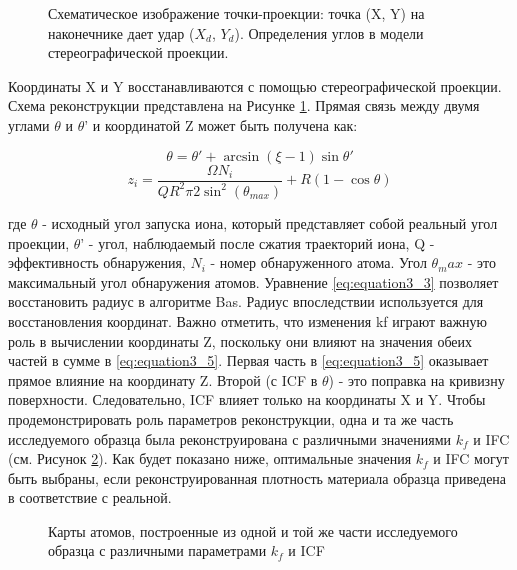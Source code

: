 \begin{figure}[htb]
	\caption{Схематическое изображение точки-проекции: точка (X, Y) на наконечнике дает удар ($X_d$, $Y_d$). Определения углов в модели стереографической проекции.}
	\label{fig:p3_projection}
\end{figure} 
Координаты X и Y восстанавливаются с помощью стереографической проекции. Схема реконструкции представлена на Рисунке \cref{fig:p3_projection}. Прямая связь между двумя углами $\theta$ и $\theta$' и координатой Z может быть получена как:

\begin{equation}
	\label{eq:equation3_4}
	\theta = \theta' + \arcsin(\xi - 1)\sin{\theta'}
\end{equation}
\begin{equation}
	\label{eq:equation3_5}
	z_i = \frac{\Omega N_i}{Q R^2 \pi 2 {\sin^2(\theta_{max})}} + R (1- \cos{\theta})
\end{equation}

где $\theta$ - исходный угол запуска иона, который представляет собой реальный угол проекции, $\theta$' - угол, наблюдаемый после сжатия траекторий иона, Q - эффективность обнаружения, $N_i$ - номер обнаруженного атома. Угол $\theta_max$ - это максимальный угол обнаружения атомов. Уравнение \cref{eq:equation3_3} позволяет восстановить радиус в алгоритме Bas. Радиус впоследствии используется для восстановления координат. Важно отметить, что изменения kf играют важную роль в вычислении координаты Z, поскольку они влияют на значения обеих частей в сумме в \cref{eq:equation3_5}. Первая часть в \cref{eq:equation3_5} оказывает прямое влияние на координату Z. Второй (с ICF в $\theta$) - это поправка на кривизну поверхности. Следовательно, ICF влияет только на координаты X и Y. Чтобы продемонстрировать роль параметров реконструкции, одна и та же часть исследуемого образца была реконструирована с различными значениями $k_f$ и IFC (см. Рисунок \cref{fig:p3_3Dparts}). Как будет показано ниже, оптимальные значения $k_f$ и IFC могут быть выбраны, если реконструированная плотность материала образца приведена в соответствие с реальной.

\begin{figure}[htb]
	\caption{Карты атомов, построенные из одной и той же части исследуемого образца с различными параметрами $k_f$ и ICF}
	\label{fig:p3_3Dparts}
\end{figure}

